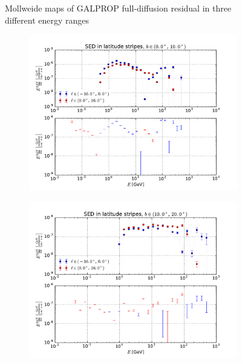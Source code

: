 \documentclass[a4paper]{article}
\begin{document}
\begin{figure}
\begin{subfigure}{0.7\textwidth}
    \end{subfigure} 
    \caption{Mollweide maps of GALPROP full-diffusion residual in three different energy ranges}
\end{figure}


\begin{figure}
    \begin{subfigure}{0.5\textwidth}
        \includegraphics[width=\textwidth]{spectrum_of_top_bubble_in_lat_stripes_0-10.pdf}
    \end{subfigure} 
    \begin{subfigure}{0.5\textwidth}
        \includegraphics[width=\textwidth]{spectrum_of_top_bubble_in_lat_stripes_10-20.pdf}
    \end{subfigure}

\end{figure}
\end{document}
